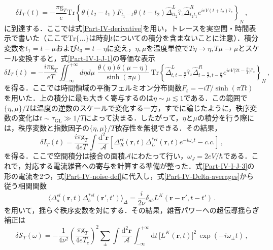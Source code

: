 \documentclass[a4paper,11pt]{ltjsarticle}
\def\Tr{\mathrm{Tr}}
\begin{document}
\begin{equation}\label{Part-IV-I-J-1}
\delta I_{T}(t)=-\frac{\pi
\mathrm{g}_{T}}{e}\Tr\left\{\theta(t_{2}-t_{1})F_{t_{1}-t}\theta(t-t_{2})
\hat{\Delta}^{L}_{tt_{2}}\hat{\tau}_{z}
\hat{\Delta}^{R}_{t_{2}t_{1}}e^{ieV(t+t_{2})\hat{\tau}_{z}}\right\}_N\,,
\end{equation}
に到達する．ここでは式\eqref{Part-IV-derivative}を用い，トレースを実空間・時間表示で書いた（ここで$\mathrm{Tr}\{\ldots\}$は時刻$t$についての積分を含まないことに注意）．積分変数を$t_{1}=t-\mu$および$t_{3}=t-\eta$に変え，$\eta,\mu$を温度単位で$T\eta\to\eta, T\mu\to\mu$とスケール変換すると，式\eqref{Part-IV-I-J-1}の等価な表示
\begin{equation}\label{Part-IV-I-J-2}
\delta I_{T}(t)=-\frac{i\pi
\mathrm{g}_{T}}{eT}\iint^{+\infty}_{-\infty}d\eta d\mu\,\,
\frac{\theta(\eta)\theta(\mu-\eta)}{\sinh(\pi\mu)}\,
\Tr \left\{\hat{\Delta}^{L}_{t,t-\frac{\eta}{T}}\hat{\tau}_{z}
\hat{\Delta}^{R}_{t-\frac{\eta}{T},t-\frac{\mu}{T}}
e^{ieV\big(2t-\frac{\eta}{T}\big)\hat{\tau}_{z}}\right\}_N\,,
\end{equation}
を得る．ここでは時間領域の平衡フェルミオン分布関数$F_{t}=-iT/\sinh(\pi Tt)$を用いた．上の積分に最も大きく寄与するのは$\eta\sim\mu\lesssim1$である．この範囲で$\{\eta,\mu\}/T$は温度の逆数のスケールで変化する一方，すでに論じたように，秩序変数の変化は$t\sim\tau_{\mathrm{GL}}\gg1/T$によって決まる．したがって，$\eta$と$\mu$の積分を行う際には，秩序変数と指数因子の$\{\eta,\mu\}/T$依存性を無視できる．その結果，
\begin{equation}\label{Part-IV-I-J-3}
\delta I_T(t)=\frac{i\pi
\mathrm{g}_{T}}{4eT}\int\frac{\mathrm{d}^{2}\mathbf{r}}{\mathcal{A}}\left[
\Delta^{cl}_{R}(\mathbf{r},t)\Delta^{*cl}_{L}(\mathbf{r},t)
e^{-i\omega_{J}t}-c.c.\right]\,,
\end{equation}
を得る．ここで空間積分は接合の面積$\mathcal{A}$にわたって行い，$\omega_J=2eV/\hbar$である．これで，対応する電流雑音への寄与を計算する準備が整った．式\eqref{Part-IV-I-J-3}の形の電流を2つ，式\eqref{Part-IV-noise-def}に代入し，式\eqref{Part-IV-Delta-averages}から従う相関関数
$$\langle\Delta^{cl}_{a}(\mathbf{r},t)\Delta^{*cl}_{b}(\mathbf{r}',t')\rangle_{\Delta}=
\frac{i}{2\nu}\delta_{ab}L^{K}(\mathbf{r}-\mathbf{r}',t-t')\,.$$
を用いて，揺らぐ秩序変数を対にする．その結果，雑音パワーへの超伝導揺らぎ補正は
\begin{equation}\label{Part-IV-noise-correction}
\delta\mathcal{S}_{T}(\omega)=-\frac{1}{4\nu^{2}}\left(\frac{\pi
\mathrm{g}_{T}}{4eT_{c}}\right)^{2}\sum_{\pm}
\int\frac{\mathrm{d}^{2}\mathbf{r}}{\mathcal{A}}
\int^{+\infty}_{-\infty}\mathrm{d}t\,
\big[L^{K}(\mathbf{r},t)\big]^{2}\, \exp(-i\omega_{\pm}t)\,,
\end{equation}
\end{document}
